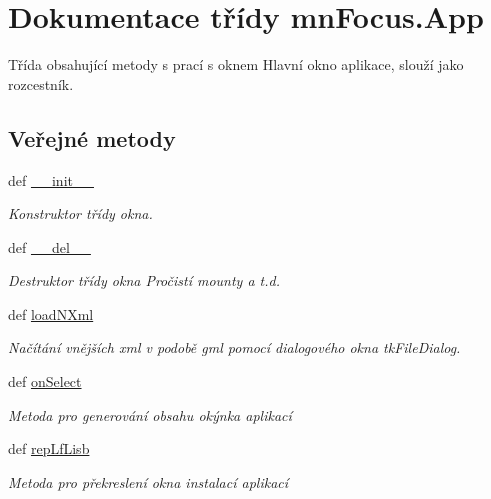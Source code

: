 \hypertarget{classmnFocus_1_1App}{\section{Dokumentace třídy mn\-Focus.\-App}
\label{db/d36/classmnFocus_1_1App}
}


Třída obsahující metody s prací s oknem Hlavní okno aplikace, slouží jako rozcestník.  


\subsection*{Veřejné metody}
\begin{DoxyCompactItemize}
\item 
def \hyperlink{classmnFocus_1_1App_a97bc8ac328112964677c50ac80a0eee5}{\-\_\-\-\_\-init\-\_\-\-\_\-}
\begin{DoxyCompactList}\small\item\em Konstruktor třídy okna. \end{DoxyCompactList}\item 
def \hyperlink{classmnFocus_1_1App_a3d339eb622b6ddb53468688907d11684}{\-\_\-\-\_\-del\-\_\-\-\_\-}
\begin{DoxyCompactList}\small\item\em Destruktor třídy okna Pročistí mounty a t.\-d. \end{DoxyCompactList}\item 
def \hyperlink{classmnFocus_1_1App_a6a8df6016b56a84b88025c5058069fb5}{load\-N\-Xml}
\begin{DoxyCompactList}\small\item\em Načítání vnějších xml v podobě gml pomocí dialogového okna tk\-File\-Dialog. \end{DoxyCompactList}\item 
def \hyperlink{classmnFocus_1_1App_a3dded74c82de81f3918cc0ea2bd1cd69}{on\-Select}
\begin{DoxyCompactList}\small\item\em Metoda pro generování obsahu okýnka aplikací \end{DoxyCompactList}\item 
def \hyperlink{classmnFocus_1_1App_acf1223e17eb4a58e53299ae8a7c34729}{rep\-Lf\-Lisb}
\begin{DoxyCompactList}\small\item\em Metoda pro překreslení okna instalací aplikací \end{DoxyCompactList}\item 

\end{DoxyCompactItemize}
